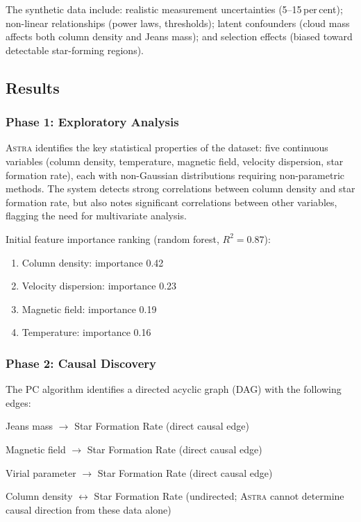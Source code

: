 \documentclass[usenatbib]{rasti}
\newcommand{\astra}{\textsc{Astra}\xspace}
\newcommand{\pc}{PC\xspace}
\begin{document}
The synthetic data include: realistic measurement uncertainties (5--15\,per\,cent); non-linear relationships (power laws, thresholds); latent confounders (cloud mass affects both column density and Jeans mass); and selection effects (biased toward detectable star-forming regions).

\subsection{Results}
\label{sec:tc6:results}

\subsubsection{Phase 1: Exploratory Analysis}
\label{sec:tc6:phase1}

\astra identifies the key statistical properties of the dataset: five continuous variables (column density, temperature, magnetic field, velocity dispersion, star formation rate), each with non-Gaussian distributions requiring non-parametric methods.
The system detects strong correlations between column density and star formation rate, but also notes significant correlations between other variables, flagging the need for multivariate analysis.

Initial feature importance ranking (random forest, $R^{2} = 0.87$):
\begin{enumerate}
  \item[(i)] Column density: importance 0.42
  \item[(ii)] Velocity dispersion: importance 0.23
  \item[(iii)] Magnetic field: importance 0.19
  \item[(iv)] Temperature: importance 0.16
\end{enumerate}

\subsubsection{Phase 2: Causal Discovery}
\label{sec:tc6:phase2}

The \pc algorithm identifies a directed acyclic graph (DAG) with the following edges:
\begin{description}
  \item Jeans mass $\rightarrow$ Star Formation Rate (direct causal edge)
  \item Magnetic field $\rightarrow$ Star Formation Rate (direct causal edge)
  \item Virial parameter $\rightarrow$ Star Formation Rate (direct causal edge)
  \item Column density $\leftrightarrow$ Star Formation Rate (undirected; \astra cannot determine causal direction from these data alone)
\end{description}
\end{document}
